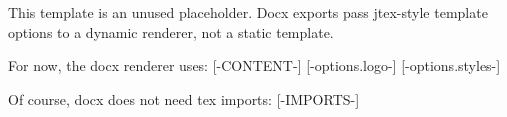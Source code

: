 This template is an unused placeholder. Docx exports pass jtex-style template options to a dynamic renderer, not a static template.

For now, the docx renderer uses:
[-CONTENT-]
[-options.logo-]
[-options.styles-]

Of course, docx does not need tex imports:
[-IMPORTS-]